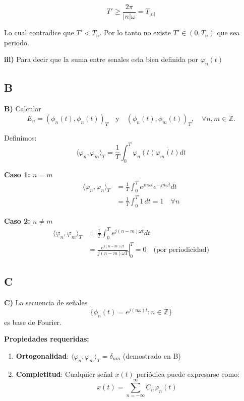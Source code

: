 $$T' \ge \dfrac{2\pi}{|n|\omega} = T_{|n|}$$

Lo cual contradice que $T'<T_n$. Por lo tanto no existe $T'\in(0,T_n)$ que sea periodo.

\textbf{iii)} Para decir que la suma entre senales esta bien definida por $\varphi_n(t)$

\vspace{0.5cm}

\subsection{B}

\textbf{B)} Calcular \[E_n = (\phi_n(t), \phi_n(t))_T \quad \text{y} \quad (\phi_n(t), \phi_m(t))_T, \quad \forall n,m \in \mathbb{Z}.\]

Definimos:
\[
\langle \varphi_n, \varphi_m \rangle_T = \frac{1}{T}\int_0^T \varphi_n(t)\overline{\varphi_m(t)}dt
\]

\textbf{Caso 1: $n = m$}
\begin{align*}
\langle \varphi_n, \varphi_n \rangle_T &= \frac{1}{T}\int_0^T e^{jn\omega t}e^{-jn\omega t}dt \\
&= \frac{1}{T}\int_0^T 1\,dt = 1 \quad \forall n
\end{align*}

\textbf{Caso 2: $n \neq m$}
\begin{align*}
\langle \varphi_n, \varphi_m \rangle_T &= \frac{1}{T}\int_0^T e^{j(n-m)\omega t}dt \\
&= \left.\frac{e^{j(n-m)\omega t}}{j(n-m)\omega T}\right|_0^T = 0 \quad \text{(por periodicidad)}
\end{align*}

\vspace{0.5cm}

\subsection{C}

\textbf{C)} La secuencia de señales \[\{ \phi_n(t) = e^{j(n\omega)t} : n \in \mathbb{Z} \}\] es base de Fourier.

\textbf{Propiedades requeridas:}
\begin{enumerate}[label=(\roman*)]
\item \textbf{Ortogonalidad}: $\langle \varphi_n, \varphi_m \rangle_T = \delta_{nm}$ (demostrado en B)
\item \textbf{Completitud}: Cualquier señal $x(t)$ periódica puede expresarse como:
\[
x(t) = \sum_{n=-\infty}^{\infty} C_n \varphi_n(t)
\]
\end{enumerate}

